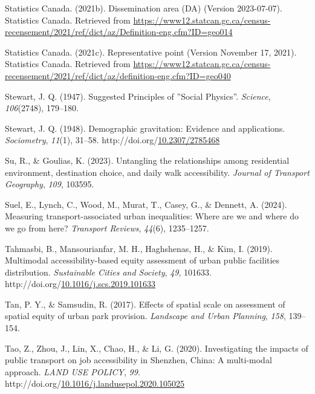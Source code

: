 \documentclass[
11pt, %
oneside, %
english, %
singlespacing, %
]{macthesis} %
\newlength{\cslhangindent}
\newenvironment{CSLReferences}[2] %
{\begin{list}{}{%
	\setlength{\itemindent}{0pt}
	\setlength{\leftmargin}{0pt}
	\setlength{\parsep}{0pt}
	\ifodd #1
	\setlength{\leftmargin}{\cslhangindent}
	\setlength{\itemindent}{-1\cslhangindent}
	\fi
	\setlength{\itemsep}{#2\baselineskip}}}
{\end{list}}
\begin{document}
\begin{CSLReferences}{1}{0}
Statistics Canada. (2021b). Dissemination area (DA) (Version 2023-07-07). Statistics Canada. Retrieved from \url{https://www12.statcan.gc.ca/census-recensement/2021/ref/dict/az/Definition-eng.cfm?ID=geo014}

Statistics Canada. (2021c). Representative point (Version November 17, 2021). Statistics Canada. Retrieved from \url{https://www12.statcan.gc.ca/census-recensement/2021/ref/dict/az/definition-eng.cfm?ID=geo040}

Stewart, J. Q. (1947). Suggested {Principles} of ''{Social} {Physics}''. \emph{Science}, \emph{106}(2748), 179--180.

Stewart, J. Q. (1948). Demographic gravitation: Evidence and applications. \emph{Sociometry}, \emph{11}(1), 31--58. http://doi.org/\href{https://doi.org/10.2307/2785468}{10.2307/2785468}

Su, R., \& Goulias, K. (2023). Untangling the relationships among residential environment, destination choice, and daily walk accessibility. \emph{Journal of Transport Geography}, \emph{109}, 103595.

Suel, E., Lynch, C., Wood, M., Murat, T., Casey, G., \& Dennett, A. (2024). Measuring transport-associated urban inequalities: Where are we and where do we go from here? \emph{Transport Reviews}, \emph{44}(6), 1235--1257.

Tahmasbi, B., Mansourianfar, M. H., Haghshenas, H., \& Kim, I. (2019). Multimodal accessibility-based equity assessment of urban public facilities distribution. \emph{Sustainable Cities and Society}, \emph{49}, 101633. http://doi.org/\href{https://doi.org/10.1016/j.scs.2019.101633}{10.1016/j.scs.2019.101633}

Tan, P. Y., \& Samsudin, R. (2017). Effects of spatial scale on assessment of spatial equity of urban park provision. \emph{Landscape and Urban Planning}, \emph{158}, 139--154.

Tao, Z., Zhou, J., Lin, X., Chao, H., \& Li, G. (2020). Investigating the impacts of public transport on job accessibility in {Shenzhen}, {China}: A multi-modal approach. \emph{LAND USE POLICY}, \emph{99}. http://doi.org/\href{https://doi.org/10.1016/j.landusepol.2020.105025}{10.1016/j.landusepol.2020.105025}


\end{CSLReferences}
\end{document}

